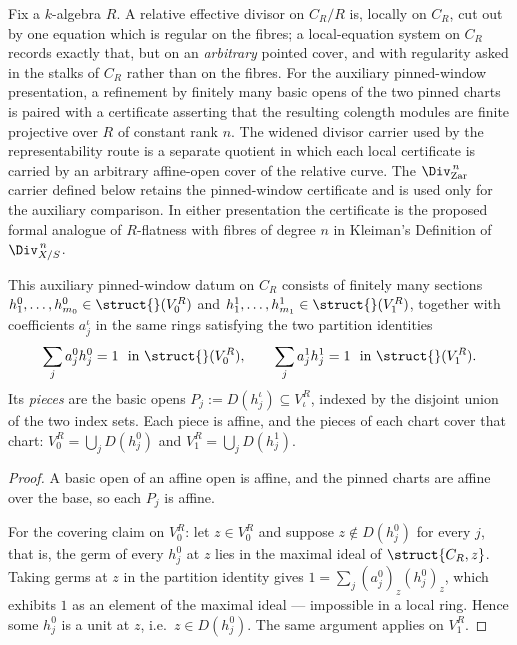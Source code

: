 Fix a \(k\)-algebra \(R\). A relative effective divisor on \(C_R/R\) is, locally on
\(C_R\), cut out by one equation which is regular on the fibres; a local-equation system on
\(C_R\) records exactly that, but on an \emph{arbitrary} pointed cover, and with regularity
asked in the stalks of \(C_R\) rather than on the fibres.  For the auxiliary pinned-window
presentation, a refinement by finitely many basic opens of the two pinned charts is paired
with a certificate asserting that the resulting colength modules are finite projective over
\(R\) of constant rank \(n\).  The widened divisor carrier used by the representability route
is a separate quotient in which each local certificate is carried by an arbitrary affine-open
cover of the relative curve.  The \(\Div^{\,n}_{\mathrm{Zar}}\) carrier defined below retains
the pinned-window certificate and is used only for the auxiliary comparison.
In either presentation the certificate is the proposed formal
analogue of \(R\)-flatness with fibres of degree \(n\) in Kleiman's Definition of
\(\Div^{\,n}_{X/S}\).

\begin{definition}
  \label{def:finCoverData}
  \leanok
  This auxiliary pinned-window datum on \(C_R\) consists of finitely many sections
  \(h^0_1,\dots,h^0_{m_0} \in \struct{}(V_0^R)\) and \(h^1_1,\dots,h^1_{m_1} \in
  \struct{}(V_1^R)\), together with coefficients \(a^\iota_j\) in the same rings satisfying
  the two partition identities
  \[
    \sum_{j} a^0_j h^0_j = 1 \ \text{ in } \struct{}(V_0^R), \qquad
    \sum_{j} a^1_j h^1_j = 1 \ \text{ in } \struct{}(V_1^R).
  \]
  Its \emph{pieces} are the basic opens \(P_j := D(h^\iota_j) \subseteq V_\iota^R\), indexed
  by the disjoint union of the two index sets. Each piece is affine, and the pieces of each
  chart cover that chart:
  \(V_0^R = \bigcup_j D(h^0_j)\) and \(V_1^R = \bigcup_j D(h^1_j)\).
\end{definition}
\begin{proof}
  \leanok
  A basic open of an affine open is affine, and the pinned charts are affine over the
  base, so each \(P_j\) is affine.

  For the covering claim on \(V_0^R\): let \(z \in V_0^R\) and suppose \(z \notin D(h^0_j)\)
  for every \(j\), that is, the germ of every \(h^0_j\) at \(z\) lies in the maximal ideal
  of \(\struct{C_R, z}\). Taking germs at \(z\) in the partition identity gives
  \(1 = \sum_j (a^0_j)_z (h^0_j)_z\), which exhibits \(1\) as an element of the maximal
  ideal --- impossible in a local ring. Hence some \(h^0_j\) is a unit at \(z\), i.e.\
  \(z \in D(h^0_j)\). The same argument applies on \(V_1^R\).
\end{proof}

